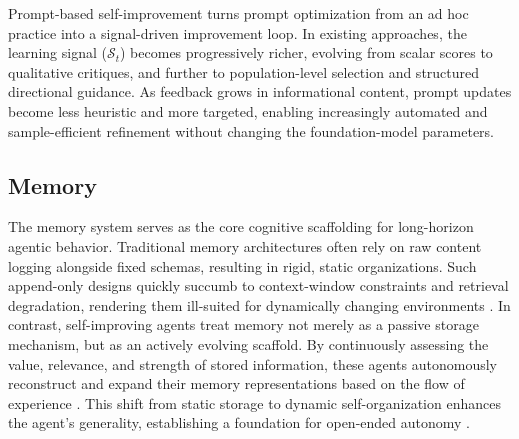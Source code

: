 \documentclass{article}
\begin{document}
\begin{ttcolorbox}[Takeaway]
Prompt-based self-improvement turns prompt optimization from an ad hoc practice into a signal-driven improvement loop. In existing approaches, the learning signal ($\mathcal{S}_t$) becomes progressively richer, evolving from scalar scores to qualitative critiques, and further to population-level selection and structured directional guidance. As feedback grows in informational content, prompt updates become less heuristic and more targeted, enabling increasingly automated and sample-efficient refinement without changing the foundation-model parameters.
\end{ttcolorbox}


\subsection{Memory}
\label{sec:Memory}

The memory system serves as the core cognitive scaffolding for long-horizon agentic behavior. Traditional memory architectures often rely on raw content logging alongside fixed schemas, resulting in rigid, static organizations. Such append-only designs quickly succumb to context-window constraints and retrieval degradation, rendering them ill-suited for dynamically changing environments \citep{modarressi2024retllmgeneralreadwritememory, he2024malmmmemoryaugmentedlargemultimodal, packer2024memgptllmsoperatingsystems}. In contrast, self-improving agents treat memory not merely as a passive storage mechanism, but as an actively evolving scaffold. By continuously assessing the value, relevance, and strength of stored information, these agents autonomously reconstruct and expand their memory representations based on the flow of experience \citep{du2025rethinkingmemoryaitaxonomy, xu2025sedm}. This shift from static storage to dynamic self-organization  enhances the agent's generality, establishing a foundation for open-ended autonomy \citep{xu2025amemagenticmemoryllm, sang2025pipelinessurveyparadigmshift, li2025memosmemoryosai}.
\end{document}
